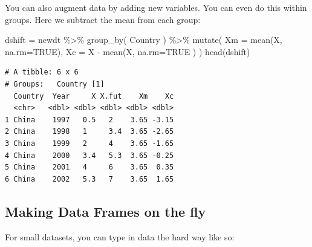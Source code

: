\documentclass[
  letterpaper,
  DIV=11,
  numbers=noendperiod]{scrreprt}
\newenvironment{Shaded}{\begin{snugshade}}{\end{snugshade}}
\newcommand{\AttributeTok}[1]{\textcolor[rgb]{0.49,0.56,0.16}{#1}}
\newcommand{\ConstantTok}[1]{\textcolor[rgb]{0.53,0.00,0.00}{#1}}
\newcommand{\FunctionTok}[1]{\textcolor[rgb]{0.02,0.16,0.49}{#1}}
\newcommand{\NormalTok}[1]{\textcolor[rgb]{0.00,0.44,0.13}{#1}}
\newcommand{\OtherTok}[1]{\textcolor[rgb]{0.00,0.44,0.13}{#1}}
\newcommand{\SpecialCharTok}[1]{\textcolor[rgb]{0.25,0.44,0.63}{#1}}
\begin{document}
You can also augment data by adding new variables. You can even do this
within groups. Here we subtract the mean from each group:

\begin{Shaded}
\begin{Highlighting}[]
\NormalTok{dshift }\OtherTok{=}\NormalTok{ newdt }\SpecialCharTok{\%\textgreater{}\%} \FunctionTok{group\_by}\NormalTok{( Country ) }\SpecialCharTok{\%\textgreater{}\%}
    \FunctionTok{mutate}\NormalTok{( }\AttributeTok{Xm =} \FunctionTok{mean}\NormalTok{(X, }\AttributeTok{na.rm=}\ConstantTok{TRUE}\NormalTok{),}
            \AttributeTok{Xc =}\NormalTok{ X }\SpecialCharTok{{-}} \FunctionTok{mean}\NormalTok{(X, }\AttributeTok{na.rm=}\ConstantTok{TRUE}\NormalTok{ ) )}
\FunctionTok{head}\NormalTok{(dshift)}
\end{Highlighting}
\end{Shaded}

\begin{verbatim}
# A tibble: 6 x 6
# Groups:   Country [1]
  Country  Year     X X.fut    Xm    Xc
  <chr>   <dbl> <dbl> <dbl> <dbl> <dbl>
1 China    1997   0.5   2    3.65 -3.15
2 China    1998   1     3.4  3.65 -2.65
3 China    1999   2     4    3.65 -1.65
4 China    2000   3.4   5.3  3.65 -0.25
5 China    2001   4     6    3.65  0.35
6 China    2002   5.3   7    3.65  1.65
\end{verbatim}

\hypertarget{making-data-frames-on-the-fly}{%
\subsection{Making Data Frames on the
fly}\label{making-data-frames-on-the-fly}}

For small datasets, you can type in data the hard way like so:
\end{document}
